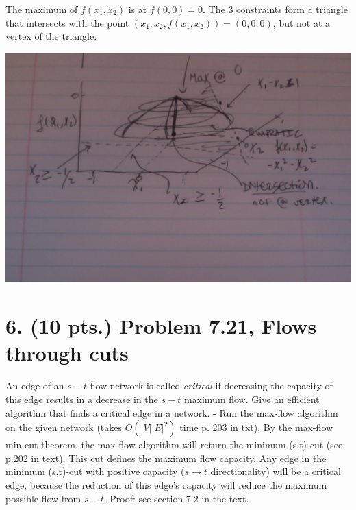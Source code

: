 \documentclass[11pt]{article}
\begin{document}
The maximum of $f(x_1,x_2)$ is at $f(0,0)=0$. The 3 constraints form a triangle 
that intersects with the point $(x_1,x_2,f(x_1,x_2))=(0,0,0)$, but not 
at a vertex of the triangle.

\includegraphics[scale=0.4]{ps9_graph.jpg}

\label{pg:end-of-p5}


%

\newpage


 \section*{6. (10 pts.) Problem 7.21, Flows through cuts}

An edge of an $s-t$ flow network is called \emph{critical} if decreasing the 
capacity of this edge results in a decrease in the $s-t$ maximum flow. 
Give an efficient algorithm that finds a critical edge in a network.
-
Run the max-flow algorithm on the given network (takes $O(|V||E|^2)$ time p. 203 in txt).
By the max-flow min-cut theorem, the max-flow algorithm will return the minimum
(s,t)-cut (see p.202 in text). This cut defines the maximum flow capacity.
Any edge in the minimum (s,t)-cut with positive capacity ($s\rightarrow t$ directionality)
will be a critical edge, because the reduction of this edge's capacity will
reduce the maximum possible flow from $s-t$. Proof: see section 7.2 in the text.
\end{document}
